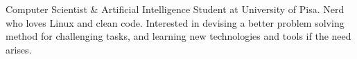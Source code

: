 

\begin{cvparagraph}

Computer Scientist \& Artificial Intelligence Student at University of Pisa. Nerd who loves Linux and clean code. Interested in devising a better problem solving method for challenging tasks, and learning new technologies and tools if the need arises.
\end{cvparagraph}
